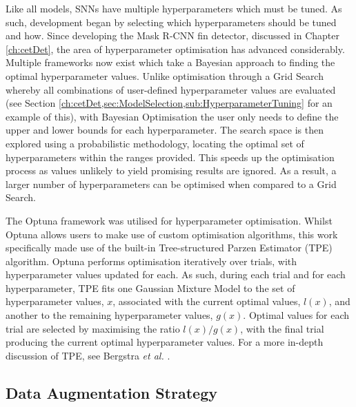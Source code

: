 Like all models, SNNs have multiple hyperparameters which must be tuned. As such, development began by selecting which hyperparameters should be tuned and how. Since developing the Mask R-CNN fin detector, discussed in Chapter \ref{ch:cetDet}, the area of hyperparameter optimisation has advanced considerably. Multiple frameworks now exist which take a Bayesian approach to finding the optimal hyperparameter values. Unlike optimisation through a Grid Search whereby all combinations of user-defined hyperparameter values are evaluated (see Section \ref{ch:cetDet,sec:ModelSelection,sub:HyperparameterTuning} for an example of this), with Bayesian Optimisation the user only needs to define the upper and lower bounds for each hyperparameter. The search space is then explored using a probabilistic methodology, locating the optimal set of hyperparameters within the ranges provided. This speeds up the optimisation process as values unlikely to yield promising results are ignored. As a result, a larger number of hyperparameters can be optimised when compared to a Grid Search. 

The Optuna framework \cite{akiba_optuna_2019}  was utilised for hyperparameter optimisation. Whilst Optuna allows users to make use of custom optimisation algorithms, this work specifically made use of the built-in Tree-structured Parzen Estimator (TPE) algorithm. Optuna performs optimisation iteratively over trials, with hyperparameter values updated for each. As such, during each trial and for each hyperparameter, TPE fits one Gaussian Mixture Model to the set of hyperparameter values, $x$, associated with the current optimal values, $l(x)$, and another to the remaining hyperparameter values, $g(x)$. Optimal values for each trial are selected by maximising the ratio $l(x)/g(x)$, with the final trial producing the current optimal hyperparameter values. For a more in-depth discussion of TPE, see Bergstra \textit{et al.} \cite{bergstra_algorithms_2011}.





\subsection{Data Augmentation Strategy}\label{ch:ID,sec:SNNDevelopment,sub:DataAugmentation}



